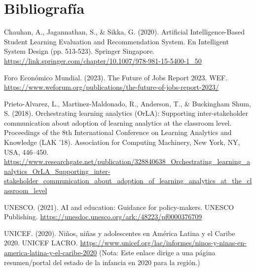 \section{Bibliografía}

Chauhan, A., Jagannathan, S., \& Sikka, G. (2020). Artificial Intelligence-Based Student Learning Evaluation and Recommendation System. En Intelligent System Design (pp. 513-523). Springer Singapore. \url{https://link.springer.com/chapter/10.1007/978-981-15-5400-1_50}
\newline

Foro Económico Mundial. (2023). The Future of Jobs Report 2023. WEF. \url{https://www.weforum.org/publications/the-future-of-jobs-report-2023/}
\newline

Prieto-Alvarez, L., Martinez-Maldonado, R., Anderson, T., \& Buckingham Shum, S. (2018). Orchestrating learning analytics (OrLA): Supporting inter-stakeholder communication about adoption of learning analytics at the classroom level. Proceedings of the 8th International Conference on Learning Analytics and Knowledge (LAK '18). Association for Computing Machinery, New York, NY, USA, 446–450. \url{https://www.researchgate.net/publication/328840638_Orchestrating_learning_analytics_OrLA_Supporting_inter-stakeholder_communication_about_adoption_of_learning_analytics_at_the_classroom_level}
\newline

UNESCO. (2021). AI and education: Guidance for policy-makers. UNESCO Publishing. \url{https://unesdoc.unesco.org/ark:/48223/pf0000376709}
\newline

UNICEF. (2020). Niños, niñas y adolescentes en América Latina y el Caribe 2020. UNICEF LACRO. \url{https://www.unicef.org/lac/informes/ninos-y-ninas-en-america-latina-y-el-caribe-2020} (Nota: Este enlace dirige a una página resumen/portal del estado de la infancia en 2020 para la región.)